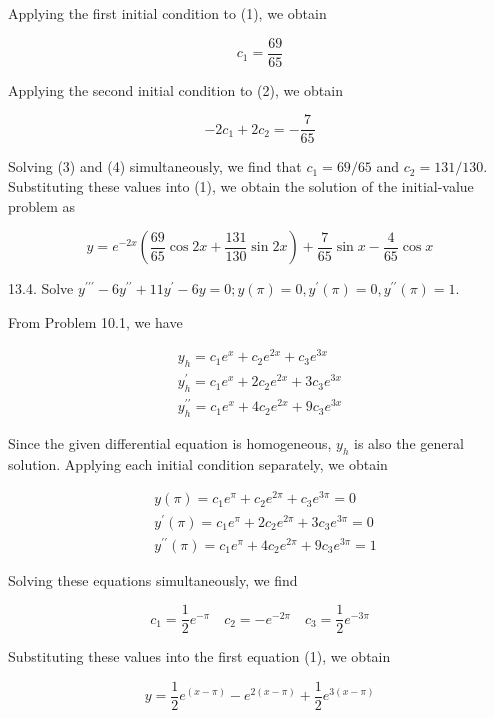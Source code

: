 \documentclass[10pt]{article}
\begin{document}
Applying the first initial condition to (1), we obtain


\begin{equation*}
c_{1}=\frac{69}{65} \tag{3}
\end{equation*}


Applying the second initial condition to (2), we obtain


\begin{equation*}
-2 c_{1}+2 c_{2}=-\frac{7}{65} \tag{4}
\end{equation*}


Solving (3) and (4) simultaneously, we find that $c_{1}=69 / 65$ and $c_{2}=131 / 130$. Substituting these values into (1), we obtain the solution of the initial-value problem as

$$
y=e^{-2 x}\left(\frac{69}{65} \cos 2 x+\frac{131}{130} \sin 2 x\right)+\frac{7}{65} \sin x-\frac{4}{65} \cos x
$$

13.4. Solve $y^{\prime \prime \prime}-6 y^{\prime \prime}+11 y^{\prime}-6 y=0 ; y(\pi)=0, y^{\prime}(\pi)=0, y^{\prime \prime}(\pi)=1$.

From Problem 10.1, we have


\begin{gather*}
y_{h}=c_{1} e^{x}+c_{2} e^{2 x}+c_{3} e^{3 x}  \tag{1}\\
y_{h}^{\prime}=c_{1} e^{x}+2 c_{2} e^{2 x}+3 c_{3} e^{3 x} \\
y_{h}^{\prime \prime}=c_{1} e^{x}+4 c_{2} e^{2 x}+9 c_{3} e^{3 x}
\end{gather*}


Since the given differential equation is homogeneous, $y_{h}$ is also the general solution. Applying each initial condition separately, we obtain

$$
\begin{aligned}
& y(\pi)=c_{1} e^{\pi}+c_{2} e^{2 \pi}+c_{3} e^{3 \pi}=0 \\
& y^{\prime}(\pi)=c_{1} e^{\pi}+2 c_{2} e^{2 \pi}+3 c_{3} e^{3 \pi}=0 \\
& y^{\prime \prime}(\pi)=c_{1} e^{\pi}+4 c_{2} e^{2 \pi}+9 c_{3} e^{3 \pi}=1
\end{aligned}
$$

Solving these equations simultaneously, we find

$$
c_{1}=\frac{1}{2} e^{-\pi} \quad c_{2}=-e^{-2 \pi} \quad c_{3}=\frac{1}{2} e^{-3 \pi}
$$

Substituting these values into the first equation (1), we obtain

$$
y=\frac{1}{2} e^{(x-\pi)}-e^{2(x-\pi)}+\frac{1}{2} e^{3(x-\pi)}
$$
\end{document}
